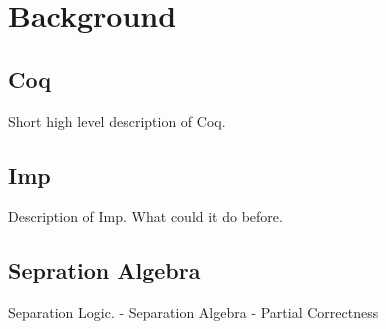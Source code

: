 \section{Background}
\subsection{Coq}
Short high level description of Coq.
\subsection{Imp}
Description of Imp. What could it do before.
\subsection{Sepration Algebra}
Separation Logic.
 - Separation Algebra
 - Partial Correctness